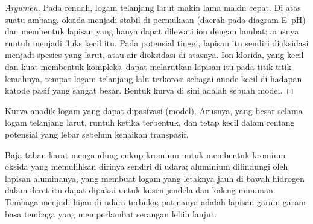 \begin{proof}[Argumen]
Pada  rendah, logam telanjang larut makin lama makin cepat. Di
atas suatu ambang, oksida menjadi stabil di permukaan (daerah  pada
diagram E--pH) dan membentuk lapisan yang hanya dapat dilewati ion dengan
lambat: arusnya runtuh menjadi fluks kecil itu. Pada potensial tinggi,
lapisan itu sendiri dioksidasi menjadi spesies yang larut, atau air
dioksidasi di atasnya. Ion klorida, yang kecil dan kuat membentuk kompleks,
dapat melarutkan lapisan itu pada titik-titik lemahnya, tempat logam
telanjang lalu terkorosi sebagai anode kecil di hadapan katode pasif yang
sangat besar. Bentuk kurva di sini adalah sebuah model.
\end{proof}

\begin{omfigure}

{\small Kurva anodik logam yang dapat dipasivasi (model). Arusnya, yang
besar selama logam telanjang larut, runtuh ketika  terbentuk,
dan tetap kecil dalam rentang potensial yang lebar sebelum kenaikan
transpasif.}
\end{omfigure}

Baja tahan karat mengandung cukup kromium untuk membentuk 
kromium oksida yang memulihkan dirinya sendiri di udara; aluminium
dilindungi oleh lapisan aluminanya, yang membuat logam yang letaknya jauh
di bawah hidrogen dalam deret itu dapat dipakai untuk kusen jendela dan
kaleng minuman. Tembaga menjadi hijau di udara terbuka; patinanya adalah
lapisan garam-garam basa tembaga yang memperlambat serangan lebih lanjut.

